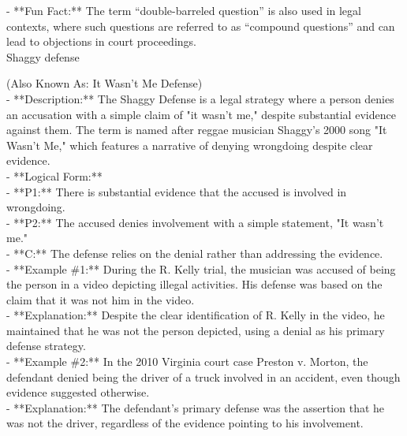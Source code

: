 \documentclass[a4paper,12pt,single,pdftex]{scrartcl}
\begin{document}
    
      - **Fun Fact:** The term “double-barreled question” is also used in legal contexts, where such questions are referred to as “compound questions” and can lead to objections in court proceedings.
    \\

  

Shaggy defense
    
      (Also Known As: It Wasn't Me Defense)
    \\

  
    
      - **Description:** The Shaggy Defense is a legal strategy where a person denies an accusation with a simple claim of "it wasn't me," despite substantial evidence against them. The term is named after reggae musician Shaggy's 2000 song "It Wasn't Me," which features a narrative of denying wrongdoing despite clear evidence.
    \\

    
      - **Logical Form:**
    \\

    
        - **P1:** There is substantial evidence that the accused is involved in wrongdoing.
    \\

    
        - **P2:** The accused denies involvement with a simple statement, "It wasn’t me."
    \\

    
        - **C:** The defense relies on the denial rather than addressing the evidence.
    \\

    
      - **Example \#1:** During the R. Kelly trial, the musician was accused of being the person in a video depicting illegal activities. His defense was based on the claim that it was not him in the video.
    \\

    
      - **Explanation:** Despite the clear identification of R. Kelly in the video, he maintained that he was not the person depicted, using a denial as his primary defense strategy.
    \\

    
      - **Example \#2:** In the 2010 Virginia court case Preston v. Morton, the defendant denied being the driver of a truck involved in an accident, even though evidence suggested otherwise.
    \\

    
      - **Explanation:** The defendant’s primary defense was the assertion that he was not the driver, regardless of the evidence pointing to his involvement.
    \\
\end{document}
